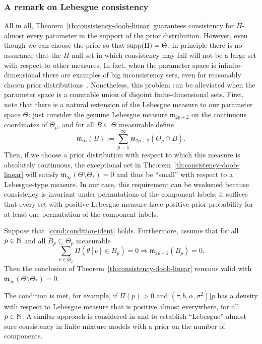\subsubsection*{A remark on Lebesgue consistency}

All in all, Theorem~\ref{th:consistency-doob-linear} guarantees consistency for \(\Pi\)-almost every parameter in the support of the prior distribution. However, even though we can choose the prior so that \(\operatorname{supp}( \Pi) = \Theta\), in principle there is no assurance that the \(\Pi\)-null set in which consistency may fail will not be a large set with respect to other measures. In fact, when the parameter space is infinite-dimensional there are examples of big inconsistency sets, even for reasonably chosen prior distributions~\citep{diaconis1986consistency}. Nonetheless, this problem can be alleviated when the parameter space is a countable union of disjoint finite-dimensional sets. First, note that there is a natural extension of the Lebesgue measure to our parameter space \(\Theta\): just consider the genuine Lebesgue measure \(\mathfrak{m}_{2p+2}\) on the continuous coordinates of \(\Theta_p\), and for all \(B\subseteq \Theta\) measurable define 
\[
\mathfrak{m}_\infty(B) := \sum_{p=1}^\infty \mathfrak{m}_{2p+2}(\Theta_p \cap B).
\]
Then, if we choose a prior distribution with respect to which this measure is absolutely continuous, the exceptional set in Theorem~\ref{th:consistency-doob-linear} will satisfy \(\mathfrak{m}_\infty(\Theta \setminus \Theta_*)=0\) and thus be ``small'' with respect to a Lebesgue-type measure. In our case, this requirement can be weakened because consistency is invariant under permutations of the component labels: it suffices that every set with positive Lebesgue measure have positive prior probability for at least one permutation of the component labels.

\begin{proposition}\label{prop:consistency-lebesgue-linear}
  Suppose that~\ref{cond:condition-ident} holds. Furthermore, assume that for all \(p\in\mathbb{N}\) and all \(B_p\subseteq \Theta_p\) measurable
  \[
  \sum_{\nu\in \mathfrak{S}_p} \Pi(\theta[\nu] \in B_p) = 0 \Longrightarrow \mathfrak{m}_{2p+2}(B_p)=0.
  \]
  Then the conclusion of Theorem~\ref{th:consistency-doob-linear} remains valid with \(\mathfrak{m}_\infty(\Theta \setminus \Theta_*)=0\).
\end{proposition}

The condition is met, for example, if \(\Pi(p)>0\) and \((\tau, b, \alpha, \sigma^2)| p\) has a density with respect to Lebesgue measure that is positive almost everywhere, for all \(p\in\mathbb{N}\). A similar approach is considered in \citet{nobile1994bayesian} and \citet{miller2023consistency} to establish ``Lebesgue''-almost sure consistency in finite mixture models with a prior on the number of components.

